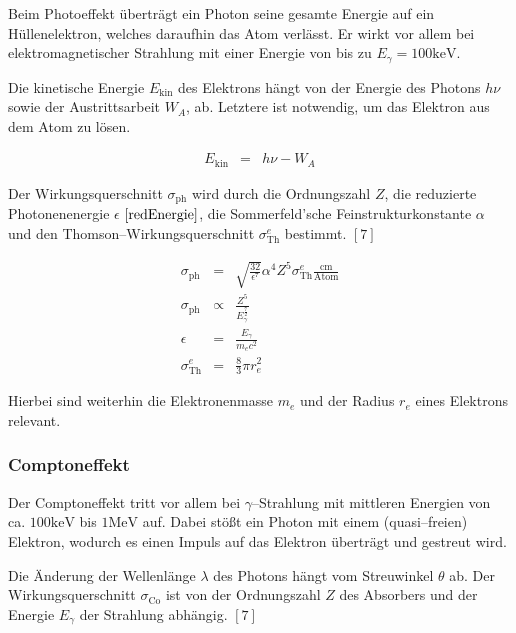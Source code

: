 \documentclass[12pt,a4paper]{scrartcl}
\numberwithin{equation}{section} %
\newcommand{\pu}[1]{\ensuremath{\mathrm{#1}}}
\renewcommand{\[}{} %
\renewcommand{\]}{\noindent} %
\begin{document}
Beim Photoeffekt überträgt ein Photon seine gesamte Energie auf ein
Hüllenelektron, welches daraufhin das Atom verlässt. Er wirkt vor allem
bei elektromagnetischer Strahlung mit einer Energie von bis zu
\(E_\gamma = \pu{100 keV}\).

Die kinetische Energie \(E_\mathrm{kin}\) des Elektrons hängt von der
Energie des Photons \(h\nu\) sowie der Austrittsarbeit \(W_A\), ab.
Letztere ist notwendig, um das Elektron aus dem Atom zu lösen.

\[
\begin{eqnarray}
    E_\mathrm{kin} &=& h\nu - W_A
\end{eqnarray}
\]

Der Wirkungsquerschnitt \(\sigma_\mathrm{ph}\) wird durch die
Ordnungszahl \(Z\), die reduzierte Photonenenergie \(\epsilon\)
\(\eqref{redEnergie}\), die Sommerfeld'sche Feinstrukturkonstante
\(\alpha\) und den Thomson--Wirkungsquerschnitt \(\sigma_\mathrm{Th}^e\)
bestimmt. \([7]\)

\[
\begin{eqnarray}
    \sigma_\mathrm{ph}
        &=& \sqrt{\frac{32}{\epsilon^7}}\alpha^4 Z^5
            \sigma_\mathrm{Th}^e \pu{\frac{cm}{Atom}} \\
    \sigma_\mathrm{ph}
        &\propto& \frac{Z^5}{E_\gamma^{\frac{7}{2}}} \\
    \epsilon &=& \frac{E_\gamma}{m_ec^2} \label{redEnergie} \\
    \sigma_\mathrm{Th}^e &=& \frac{8}{3} \pi r_e^2
\end{eqnarray}
\]

Hierbei sind weiterhin die Elektronenmasse \(m_e\) und der Radius
\(r_e\) eines Elektrons relevant.

\hypertarget{comptoneffekt}{%
\subsubsection{Comptoneffekt}\label{comptoneffekt}}

Der Comptoneffekt tritt vor allem bei \(\gamma\)--Strahlung mit
mittleren Energien von ca. \(\pu{100 keV}\) bis \(\pu{1 MeV}\) auf.
Dabei stößt ein Photon mit einem (quasi--freien) Elektron, wodurch es
einen Impuls auf das Elektron überträgt und gestreut wird.

Die Änderung der Wellenlänge \(\lambda\) des Photons hängt vom
Streuwinkel \(\theta\) ab. Der Wirkungsquerschnitt
\(\sigma_\mathrm{Co}\) ist von der Ordnungszahl \(Z\) des Absorbers und
der Energie \(E_\gamma\) der Strahlung abhängig. \([7]\)
\end{document}
